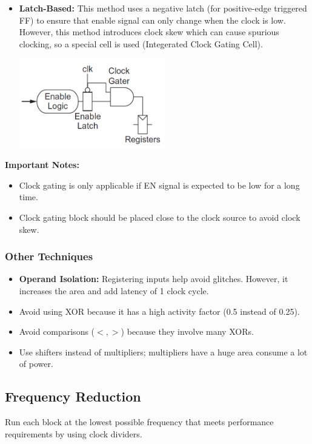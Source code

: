 \documentclass[11pt]{article}
\begin{document}
\begin{itemize}
\begin{multicols}{2}
\begin{minipage}{\linewidth}
\begin{center}
                \end{center}
            \end{minipage}
        \end{multicols}
    \item \textbf{Latch-Based:} This method uses a negative latch (for positive-edge triggered FF) to ensure that enable signal can only change when the clock is low. However, this method introduces clock skew which can cause spurious clocking, so a special cell is used (Integerated Clock Gating Cell).
        \begin{center}
            \includegraphics[width=0.5\textwidth]{3.png}
        \end{center}
\end{itemize}
\textbf{Important Notes:}
\begin{itemize}
    \item Clock gating is only applicable if EN signal is expected to be low for a long time.
    \item Clock gating block should be placed close to the clock source to avoid clock skew.
\end{itemize}

\subsubsection*{Other Techniques}
\begin{itemize}
    \item \textbf{Operand Isolation:} Registering inputs help avoid glitches. However, it increases the area and add latency of 1 clock cycle.
    \item Avoid using XOR because it has a high activity factor (0.5 instead of 0.25).
    \item Avoid comparisons ($ <, >$) because they involve many XORs.
    \item Use shifters instead of multipliers; multipliers have a huge area consume a lot of power.
\end{itemize}

\subsection*{Frequency Reduction}
Run each block at the lowest possible frequency that meets performance requirements by using clock dividers.
\end{document}
